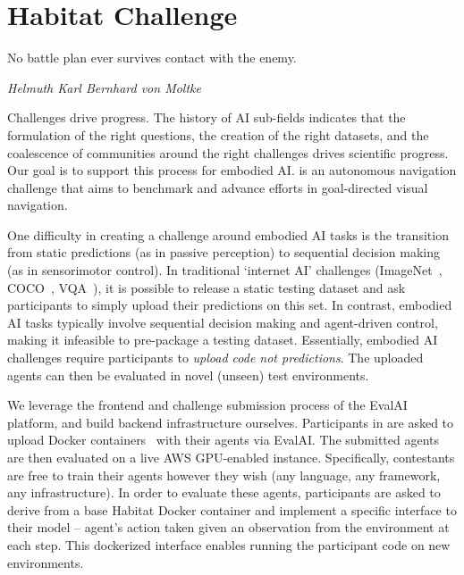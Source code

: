 \section{Habitat Challenge}

\setlength{\epigraphwidth}{0.8\columnwidth}
\epigraph{No battle plan ever survives contact with the enemy.}{\textit{Helmuth Karl Bernhard von Moltke}}


Challenges drive progress. The history of AI sub-fields indicates that the formulation of the right questions, the creation of the right datasets, and the coalescence of communities around the right challenges drives scientific progress. 
Our goal is to support this process for embodied AI. 
\habitatchal is an autonomous navigation challenge  
that aims to benchmark and advance efforts in 
goal-directed visual navigation. 

One difficulty in creating a challenge 
around embodied AI tasks is the transition from 
static predictions (as in passive perception) to sequential 
decision making (as in sensorimotor control).
In traditional `internet AI' challenges 
(\eg ImageNet~\cite{Deng09imagenet}, COCO~\cite{mscoco}, VQA~\cite{antol_iccv15}), it is possible to release a static testing 
dataset and ask participants to simply upload their predictions on this 
set. In contrast, embodied AI tasks typically involve sequential decision making and agent-driven control, making it infeasible to pre-package a testing dataset. 
Essentially, embodied AI challenges require participants 
to \emph{upload code not predictions}. The uploaded agents 
can then be evaluated in novel (unseen) test environments. 

We leverage the frontend and challenge submission process 
of the EvalAI platform, and build backend infrastructure ourselves. 
Participants in \habitatchal are asked to 
upload Docker containers~\cite{merkel2014docker} with their 
agents via EvalAI. The submitted agents are then evaluated on a live AWS GPU-enabled instance. 
Specifically, contestants are free to train their agents however they wish 
(any language, any framework, any infrastructure). 
In order to evaluate these agents, participants are asked to 
derive from a base Habitat Docker container and 
implement a specific interface to their model -- 
agent's action taken given an observation 
from the environment at each step. This dockerized interface enables running the participant code on new environments. 

